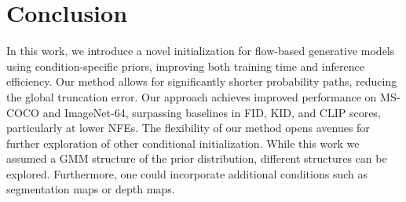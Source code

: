 \section{Conclusion}
In this work, we introduce a novel initialization for flow-based generative models using condition-specific priors, improving both training time and inference efficiency. 
Our method allows for significantly shorter probability paths, reducing the global truncation error.  
Our approach achieves improved performance on MS-COCO and ImageNet-64, surpassing baselines in FID, KID, and CLIP scores, particularly at lower NFEs.
The flexibility of our method opens avenues for further exploration of other conditional initialization. While this work we assumed a GMM structure of the prior distribution, different structures can be explored. Furthermore, one could incorporate additional conditions such as segmentation maps or depth maps. 
\clearpage

